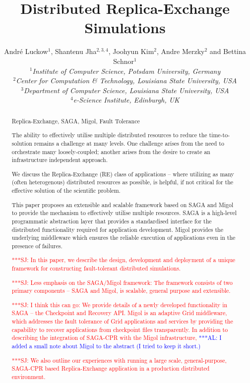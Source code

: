 \documentclass{rspublic}
\title[Distributed Replica-Exchange Simulations]{Distributed
  Replica-Exchange Simulations}
\author[Luckow, Jha, Kim, Merzky, Schnor]{
  Andr\'e Luckow$^{1}$, Shantenu Jha$^{2,3,4}$, Joohyun Kim$^{2}$, Andre Merzky$^{2}$ and Bettina Schnor$^{1}$\\
  \small{\emph{$^{1}$Institute of Computer Science, Potsdam University, Germany}}\\
  \small{\emph{$^{2}$Center for Computation \& Technology, Louisiana State University, USA}}\\
  \small{\emph{$^{3}$Department of Computer Science, Louisiana State
      University, USA}}\\
  \small{\emph{$^{4}$e-Science Institute, Edinburgh, UK}}\\
}
\newcommand{\alnote}[1]{ {\textcolor{blue} { ***AL: #1 }}}
\newcommand{\jhanote}[1]{ {\textcolor{red} { ***SJ: #1 }}}
\newcommand{\alnote}[1]{}
\newcommand{\jhanote}[1]{}
\begin{document}
 


\maketitle    

\begin{abstract}{Replica-Exchange, SAGA, Migol, Fault Tolerance}  

  The ability to effectively utilise multiple distributed resources to
  reduce the time-to-solution remains a challenge at many levels.  One
  challenge arises from the need to orchestrate many loosely-coupled;
  another arises from the desire to create an infrastructure
  independent approach.

  We discuss the Replica-Exchange (RE) class of applications -- where
  utilizing as many (often heterogenous) distributed resources as
  possible, is helpful, if not critical for the effective solution of
  the scientific problem.  

  This paper proposes an extensible and scalable framework based on
  SAGA and Migol to provide the mechanism to effectively utilise
  multiple resources. SAGA is a high-level programmatic abstraction
  layer that provides a standardised interface for the distributed
  functionality required for application development. Migol provides
  the underlying middleware which ensures the reliable execution of
  applications even in the presence of failures.


  \jhanote{In this paper, we describe the design, development and
    deployment of a unique framework for constructing fault-tolerant
    distributed simulations.}

  \jhanote{Less emphasis on the SAGA/Migol framework: The framework
    consists of two primary components -- SAGA and Migol, is scalable,
    general purpose and extensible.}

  \jhanote{I think this can go: We provide details of a newly
    developed functionality in SAGA -- the Checkpoint and Recovery
    API. Migol is an adaptive Grid middleware, which addresses the
    fault tolerance of Grid applications and services by providing the
    capability to recover applications from checkpoint files
    transparently.  In addition to describing the integration of
    SAGA-CPR with the Migol infrastructure,}
  \alnote{I added a small note about Migol to the abstract (I tried to keep
    it short.)}

  \jhanote{We also outline our experiences with running a large scale,
    general-purpose, SAGA-CPR based Replica-Exchange application in a
    production distributed environment.}

\end{abstract}
\end{document}
